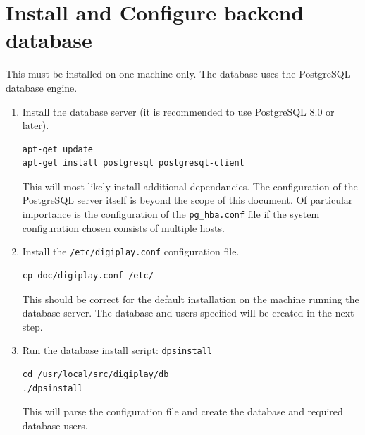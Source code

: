 \documentclass[a4paper,12pt]{report}
\numberwithin{equation}{section}
\begin{document}
\section{Install and Configure backend database}
This must be installed on one machine only. The database uses the PostgreSQL database engine.
\begin{enumerate}
\item Install the database server (it is recommended to use PostgreSQL 8.0 or later).
\begin{lstlisting}
apt-get update
apt-get install postgresql postgresql-client
\end{lstlisting}
This will most likely install additional dependancies. The configuration of the PostgreSQL server itself is beyond the scope of this document. Of particular importance is the configuration of the \texttt{pg\_hba.conf} file if the system configuration chosen consists of multiple hosts.
\item Install the \texttt{/etc/digiplay.conf} configuration file.
\begin{lstlisting}
cp doc/digiplay.conf /etc/
\end{lstlisting}
This should be correct for the default installation on the machine running the database server. The database and users specified will be created in the next step.
\item Run the database install script: \texttt{dpsinstall}
\begin{lstlisting}
cd /usr/local/src/digiplay/db
./dpsinstall
\end{lstlisting}
This will parse the configuration file and create the database and required database users.
\end{enumerate}
\end{document}
